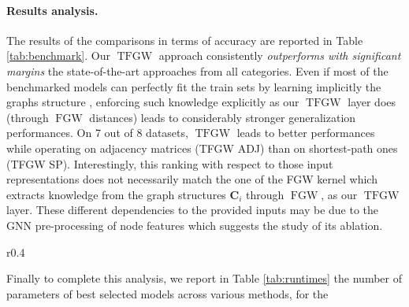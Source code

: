 \documentclass{article}
\def\mC{{\bm{C}}}
\newcommand{\FGW}{\operatorname{FGW}}
\newcommand{\TFGW}{\operatorname{TFGW}}
\begin{document}
\paragraph{Results analysis.} The results of the comparisons in terms of accuracy
are reported in Table \ref{tab:benchmark}. Our $\TFGW$ approach consistently
\emph{outperforms with significant margins} the state-of-the-art approaches from all
categories. Even if most of the benchmarked models can perfectly fit the train sets by learning implicitly the graphs structure \cite{xu2018powerful,papp2021dropgnn,maron2019provably}, enforcing such knowledge explicitly as our $\TFGW$ layer does (through $\FGW$ distances) leads to considerably stronger generalization performances. On 7 out of 8 datasets, $\TFGW$ leads to better performances while operating on adjacency matrices (TFGW ADJ) than on shortest-path ones (TFGW SP).
Interestingly, this ranking with respect to those input representations does not
necessarily match the one of the FGW kernel which extracts knowledge from the
graph structures $\mC_i$ through $\FGW$, as our $\TFGW$ layer. These different
dependencies to the provided inputs may be due to the GNN pre-processing of node
features which suggests the study of its ablation. \begin{wraptable}{r}{0.4\textwidth} 
	\vspace{-5mm}
	\caption{Number of parameters and averaged prediction time per graph. } \label{tab:runtimes}
	\begin{center}
	\end{center}
\end{wraptable}
Finally to complete this analysis, we report in Table \ref{tab:runtimes}
the number of parameters of best selected models across various methods, for the
\end{document}

